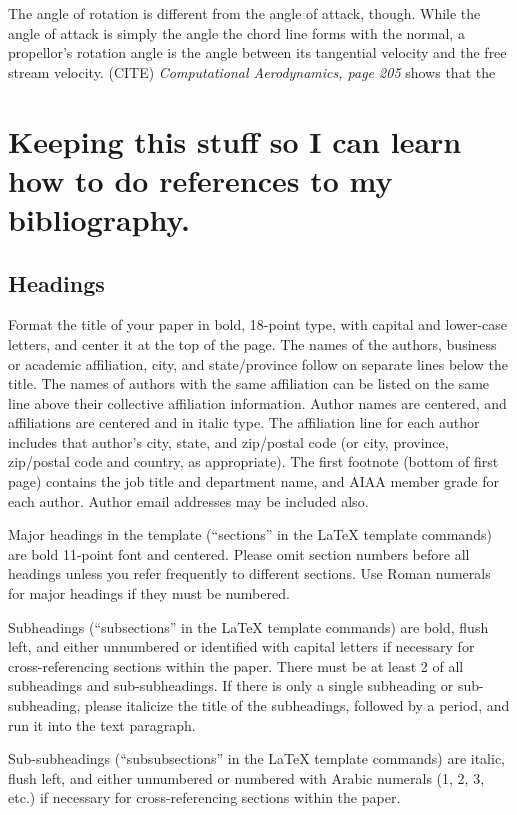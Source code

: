\documentclass[journal ]{new-aiaa}
\begin{document}
The angle of rotation is different from the angle of attack, though. While the angle of attack is simply the angle the chord line forms with the normal, a propellor's rotation angle is the angle between its tangential velocity and the free stream velocity. (CITE) \emph{Computational Aerodynamics, page 205} shows that the 






\section{Keeping this stuff so I can learn how to do references to my bibliography.}

\subsection{Headings}
Format the title of your paper in bold, 18-point type, with capital and lower-case letters, and center it at the top of the page. The names of the authors, business or academic affiliation, city, and state/province follow on separate lines below the title. The names of authors with the same affiliation can be listed on the same line above their collective affiliation information. Author names are centered, and affiliations are centered and in italic type. The affiliation line for each author includes that author’s city, state, and zip/postal code (or city, province, zip/postal code and country, as appropriate). The first footnote (bottom of first page) contains the job title and department name, and AIAA member grade for each author. Author email addresses may be included also.

Major headings in the template (``sections'' in the \LaTeX{} template commands) are bold 11-point font and centered. Please omit section numbers before all headings unless you refer frequently to different sections. Use Roman numerals for major headings if they must be numbered.

Subheadings (``subsections'' in the \LaTeX{} template commands) are bold, flush left, and either unnumbered or identified with capital letters if necessary for cross-referencing sections within the paper. There must be at least 2 of all subheadings and sub-subheadings. If there is only a single subheading or sub-subheading, please italicize the title of the subheadings, followed by a period, and run it into the text paragraph. 

Sub-subheadings (``subsubsections'' in the \LaTeX{} template commands) are italic, flush left, and either unnumbered or numbered with Arabic numerals (1, 2, 3, etc.) if necessary for cross-referencing sections within the paper.
\end{document}
